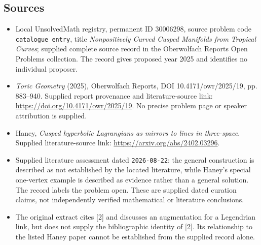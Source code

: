 \documentclass[11pt]{article}
\begin{document}
\subsection{Sources}
\begin{itemize}
\item Local UnsolvedMath registry, permanent ID \(30006298\), source problem code \texttt{catalogue entry}, title \emph{Nonpositively Curved Cusped Manifolds from Tropical Curves}; supplied complete source record in the Oberwolfach Reports Open Problems collection. The record gives proposed year 2025 and identifies no individual proposer.
\item \emph{Toric Geometry} (2025), Oberwolfach Reports, DOI 10.4171/owr/2025/19, pp. 883--940. Supplied report provenance and literature-source link: \url{https://doi.org/10.4171/owr/2025/19}. No precise problem page or speaker attribution is supplied.
\item Haney, \emph{Cusped hyperbolic Lagrangians as mirrors to lines in three-space}. Supplied literature-source link: \url{https://arxiv.org/abs/2402.03296}.
\item Supplied literature assessment dated \texttt{2026-08-22}: the general construction is described as not established by the located literature, while Haney's special one-vertex example is described as evidence rather than a general solution. The record labels the problem open. These are supplied dated curation claims, not independently verified mathematical or literature conclusions.
\item The original extract cites [2] and discusses an augmentation for a Legendrian link, but does not supply the bibliographic identity of [2]. Its relationship to the listed Haney paper cannot be established from the supplied record alone.
\end{itemize}
\end{document}

